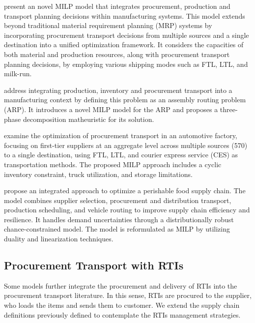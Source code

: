 \autocite{Diaz-Madronero2017ADecisions} present an novel MILP model that integrates  procurement, production and transport planning decisions within manufacturing systems. This model extends beyond traditional material requirement planning (MRP) systems by incorporating procurement transport decisions from multiple sources and a single destination into a unified optimization framework. It considers the capacities of both material and production resources, along with procurement transport planning decisions, by employing various shipping modes such as FTL, LTL, and milk-run.

\autocite{Chitsaz2019ARouting} address integrating production, inventory and procurement transport into a manufacturing context by defining this problem as an assembly routing problem (ARP). It introduces a novel MILP model for the ARP and proposes a three-phase decomposition matheuristic for its solution.

\autocite{Baller2022OptimizingApproach} examine the optimization of procurement transport in an automotive factory, focusing on first-tier suppliers at an aggregate level across multiple sources (570) to a single destination, using FTL, LTL, and courier express service (CES) as transportation methods. The proposed MILP approach includes a cyclic inventory constraint, truck utilization, and storage limitations.

\autocite{Hashemi-Amiri2023IntegratedApproach} propose an integrated approach to optimize a perishable food supply chain. The model combines supplier selection, procurement and distribution transport, production scheduling, and vehicle routing to improve supply chain efficiency and resilience. It handles demand uncertainties through a distributionally robust chance-constrained model. The model is reformulated as MILP by utilizing duality and linearization techniques.


\subsection{Procurement Transport with RTIs}
Some models further integrate the procurement and delivery of RTIs into the procurement transport literature. In this sense, RTIs are procured to the supplier, who loads the items and sends them to customer. We extend the supply chain definitions previously defined to contemplate the RTIs management strategies.

